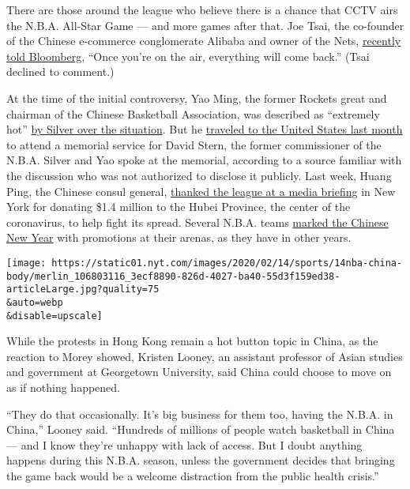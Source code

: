There are those around the league who believe there is a chance that
CCTV airs the N.B.A. All-Star Game --- and more games after that. Joe
Tsai, the co-founder of the Chinese e-commerce conglomerate Alibaba and
owner of the Nets,
\href{https://www.bloomberg.com/news/features/2020-01-22/nets-owner-joe-tsai-on-brooklyn-beijing-the-hong-kong-protests}{recently
told Bloomberg}, ``Once you're on the air, everything will come back.''
(Tsai declined to comment.)

At the time of the initial controversy, Yao Ming, the former Rockets
great and chairman of the Chinese Basketball Association, was described
as ``extremely hot''
\href{https://apnews.com/aba5856440624249962f0606602e5098}{by Silver
over the situation}. But he
\href{https://www.nba.com/article/2020/01/21/david-stern-memorial-service-story}{traveled
to the United States last month} to attend a memorial service for David
Stern, the former commissioner of the N.B.A. Silver and Yao spoke at the
memorial, according to a source familiar with the discussion who was not
authorized to disclose it publicly. Last week, Huang Ping, the Chinese
consul general,
\href{https://www.scmp.com/news/china/diplomacy/article/3049014/coronavirus-chinese-consul-general-new-york-thanks-nba-its}{thanked
the league at a media briefing} in New York for donating \$1.4 million
to the Hubei Province, the center of the coronavirus, to help fight its
spread. Several N.B.A. teams
\href{https://www.nba.com/nets/news/2020/01/28/brooklyn-nets-host-chinese-culture-night-wednesday-jan-29-barclays-center}{marked
the Chinese New Year} with promotions at their arenas, as they have in
other years.

\texttt{[image: https://static01.nyt.com/images/2020/02/14/sports/14nba-china-body/merlin\_106803116\_3ecf8890-826d-4027-ba40-55d3f159ed38-articleLarge.jpg?quality=75\\\&auto=webp\\\&disable=upscale]}

While the protests in Hong Kong remain a hot button topic in China, as
the reaction to Morey showed, Kristen Looney, an assistant professor of
Asian studies and government at Georgetown University, said China could
choose to move on as if nothing happened.

``They do that occasionally. It's big business for them too, having the
N.B.A. in China,'' Looney said. ``Hundreds of millions of people watch
basketball in China --- and I know they're unhappy with lack of access.
But I doubt anything happens during this N.B.A. season, unless the
government decides that bringing the game back would be a welcome
distraction from the public health crisis.''

